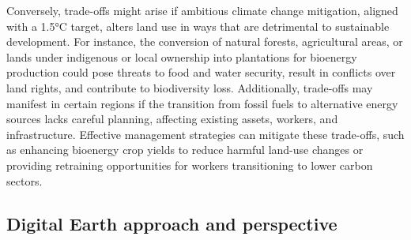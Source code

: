 Conversely, trade-offs might arise if ambitious climate change mitigation, aligned with a 1.5°C target, alters land use in ways that are detrimental to sustainable development. For instance, the conversion of natural forests, agricultural areas, or lands under indigenous or local ownership into plantations for bioenergy production could pose threats to food and water security, result in conflicts over land rights, and contribute to biodiversity loss. Additionally, trade-offs may manifest in certain regions if the transition from fossil fuels to alternative energy sources lacks careful planning, affecting existing assets, workers, and infrastructure. Effective management strategies can mitigate these trade-offs, such as enhancing bioenergy crop yields to reduce harmful land-use changes or providing retraining opportunities for workers transitioning to lower carbon sectors. \par

\subsection{Digital Earth approach and perspective}

